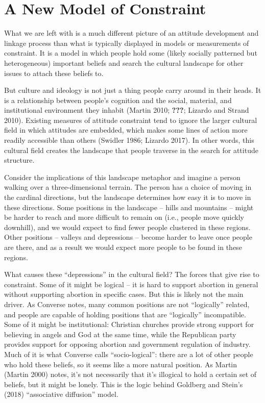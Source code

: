 \documentclass[12pt,]{article}
\begin{document}
\hypertarget{a-new-model-of-constraint}{%
\section{A New Model of Constraint}\label{a-new-model-of-constraint}}

What we are left with is a much different picture of an attitude development and linkage process than what is typically displayed in models or measurements of constraint. It is a model in which people hold some (likely socially patterned but heterogeneous) important beliefs and search the cultural landscape for other issues to attach these beliefs to.

But culture and ideology is not just a thing people carry around in their heads. It is a relationship between people's cognition and the social, material, and institutional environment they inhabit (Martin 2010; {\textbf{???}}; Lizardo and Strand 2010). Existing measures of attitude constraint tend to ignore the larger cultural field in which attitudes are embedded, which makes some lines of action more readily accessible than others (Swidler 1986; Lizardo 2017). In other words, this cultural field creates the landscape that people traverse in the search for attitude structure.

Consider the implications of this landscape metaphor and imagine a person walking over a three-dimensional terrain. The person has a choice of moving in the cardinal directions, but the landscape determines how easy it is to move in these directions. Some positions in the landscape -- hills and mountains -- might be harder to reach and more difficult to remain on (i.e., people move quickly downhill), and we would expect to find fewer people clustered in these regions. Other positions -- valleys and depressions -- become harder to leave once people are there, and as a result we would expect more people to be found in these regions.

What causes these ``depressions'' in the cultural field? The forces that give rise to constraint. Some of it might be logical -- it is hard to support abortion in general without supporting abortion in specific cases. But this is likely not the main driver. As Converse notes, many common positions are not ``logically'' related, and people are capable of holding positions that are ``logically'' incompatible. Some of it might be institutional: Christian churches provide strong support for believing in angels and God at the same time, while the Republican party provides support for opposing abortion and government regulation of industry. Much of it is what Converse calls ``socio-logical'': there are a lot of other people who hold these beliefs, so it seems like a more natural position. As Martin (Martin 2000) notes, it's not necessarily that it's illogical to hold a certain set of beliefs, but it might be lonely. This is the logic behind Goldberg and Stein's (2018) ``associative diffusion'' model.
\end{document}
